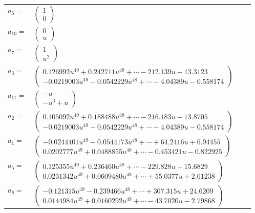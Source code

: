 \documentclass[1p]{elsarticle_modified}
\theoremstyle{definition}
\begin{document}
\begin{tabular}{m{7pt} m{180pt} m{7pt} m{180pt} }
\flushright $a_{6}=$&$\begin{pmatrix}1\\0\end{pmatrix}$ \\
\flushright $a_{10}=$&$\begin{pmatrix}0\\u\end{pmatrix}$ \\
\flushright $a_{7}=$&$\begin{pmatrix}1\\u^2\end{pmatrix}$ \\
\flushright $a_{3}=$&$\begin{pmatrix}0.126992 u^{49}+0.242711 u^{48}+\cdots-212.139 u-13.3123\\-0.0219003 u^{49}-0.0542229 u^{48}+\cdots-4.04389 u-0.558174\end{pmatrix}$ \\
\flushright $a_{11}=$&$\begin{pmatrix}- u\\- u^3+u\end{pmatrix}$ \\
\flushright $a_{2}=$&$\begin{pmatrix}0.105092 u^{49}+0.188488 u^{48}+\cdots-216.183 u-13.8705\\-0.0219003 u^{49}-0.0542229 u^{48}+\cdots-4.04389 u-0.558174\end{pmatrix}$ \\
\flushright $a_{1}=$&$\begin{pmatrix}-0.0244401 u^{49}-0.0544173 u^{48}+\cdots+64.2416 u+6.94455\\0.0202777 u^{49}+0.0488855 u^{48}+\cdots-0.453421 u-0.822925\end{pmatrix}$ \\
\flushright $a_{5}=$&$\begin{pmatrix}0.125355 u^{49}+0.236460 u^{48}+\cdots-229.828 u-15.6829\\0.0231342 u^{49}+0.0609480 u^{48}+\cdots+55.0377 u+2.61238\end{pmatrix}$ \\
\flushright $a_{8}=$&$\begin{pmatrix}-0.121315 u^{49}-0.239466 u^{48}+\cdots+307.315 u+24.6209\\0.0144984 u^{49}+0.0160292 u^{48}+\cdots-43.7020 u-2.79868\end{pmatrix}$ \\

\end{tabular}
\end{document}
